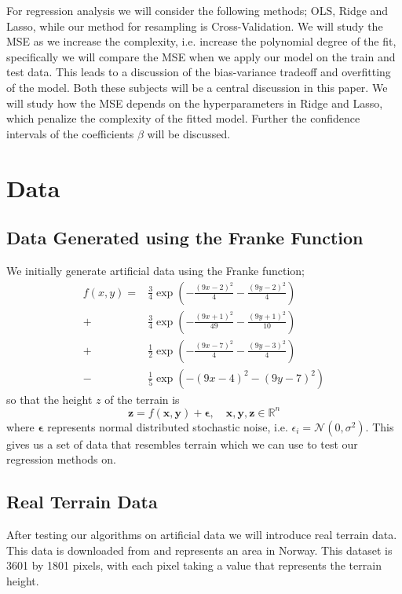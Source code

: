 \documentclass[%
 reprint,
nofootinbib,
 amsmath,amssymb,
 aps,
]{revtex4-2}
\begin{document}
For regression analysis we will consider the following methods; OLS, Ridge and Lasso, while our method for  resampling is Cross-Validation. We will study the MSE as we increase the complexity, i.e. increase the polynomial degree of the fit, specifically we will compare the MSE when we apply our model on the train and test data. This leads to a discussion of the bias-variance tradeoff and overfitting of the model. Both these subjects will be a central discussion in this paper. We will study how the MSE depends on the hyperparameters in Ridge and Lasso, which penalize the complexity of the fitted model. Further the confidence intervals of the coefficients $\beta$ will be discussed.



\section{Data}
\subsection{Data Generated using the Franke Function}
We initially generate artificial data using the Franke function;
%
\begin{align*}
f(x,y) = &\frac{3}{4} \exp\left( -\frac{(9x-2)^2}{4} -\frac{(9y - 2)^2}{4} \right) \\+&\frac{3}{4} \exp\left( -\frac{(9x+1)^2}{49} - \frac{(9y + 1)^2}{10} \right) \\+&\frac{1}{2} \exp\left( -\frac{(9x-7)^2}{4} - \frac{(9y - 3)^2}{4} \right)\\-&\frac{1}{5} \exp\left( -(9x-4)^2 - (9y - 7)^2 \right)
\end{align*}
%
so that the height $z$ of the terrain is
%
\begin{equation*}
\boldsymbol{z} = f(\boldsymbol{x},\boldsymbol{y}) + \boldsymbol{\epsilon}, \quad \boldsymbol{x}, \boldsymbol{y}, \boldsymbol{z} \in \mathbb{R}^{n}
\end{equation*}
%
where $\boldsymbol{\epsilon}$ represents normal distributed stochastic noise, i.e. $\epsilon_i = \mathcal{N}(0, \sigma^2)$. This gives us a set of data that resembles terrain which we can use to test our regression methods on.

\subsection{Real Terrain Data}
After testing our algorithms on artificial data we will introduce real terrain data. This data is downloaded from \cite{terrain} and represents an area in Norway. This dataset is 3601 by 1801 pixels, with each pixel taking a value that represents the terrain height.
\end{document}
